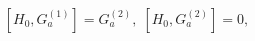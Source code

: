 \begin{equation}
\left[ H_{0},G_{a}^{(1)}\right] =G_{a}^{(2)},\;\left[
H_{0},G_{a}^{(2)}\right] =0,  \label{f12}
\end{equation}

